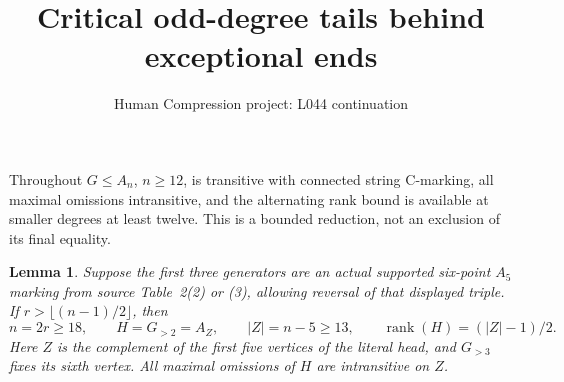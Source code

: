 \documentclass[11pt,a4paper]{article}
\title{Critical odd-degree tails behind exceptional ends}
\author{Human Compression project: L044 continuation}
\date{}
\newtheorem{lemma}{Lemma}
\begin{document}
\maketitle
Throughout $G\leq A_n$, $n\geq12$, is transitive with connected
string C-marking, all maximal omissions intransitive, and the
alternating rank bound is available at smaller degrees at least twelve.
This is a bounded reduction, not an exclusion of its final equality.

\begin{lemma}
Suppose the first three generators are an actual supported
six-point $A_5$ marking from source Table~2(2) or (3),
allowing reversal of that displayed triple. If $r>\lfloor(n-1)/2\rfloor$, then
\[
 n=2r\geq18,\qquad H=G_{>2}=A_Z,\qquad
 |Z|=n-5\geq13,\qquad \operatorname{rank}(H)=(|Z|-1)/2.
\]
Here $Z$ is the complement of the first five vertices of the
literal head, and $G_{>3}$ fixes its sixth vertex. All maximal
omissions of $H$ are intransitive on $Z$.
\end{lemma}
\end{document}
